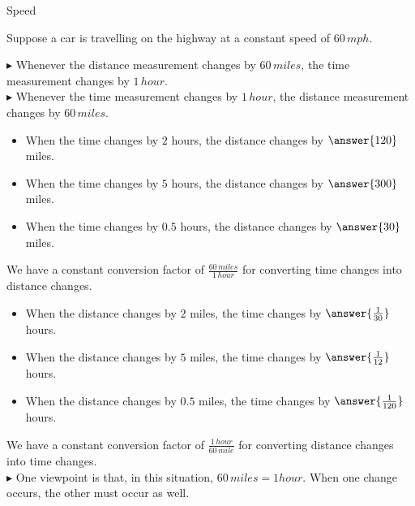\documentclass{ximera}
\begin{document}
\begin{example} Speed


Suppose a car is travelling on the highway at a constant speed of $60 \, mph$.


$\blacktriangleright$ Whenever the distance measurement changes by $60 \, miles$, the time measurement changes by $1 \, hour$. \\
$\blacktriangleright$ Whenever the time measurement changes by $1 \, hour$, the distance measurement changes by $60 \, miles$. \\




\begin{itemize}
\item When the time changes by $2$ hours, the distance changes by $\answer{120}$ miles. \\
\item When the time changes by $5$ hours, the distance changes by $\answer{300}$ miles. \\
\item When the time changes by $0.5$ hours, the distance changes by $\answer{30}$ miles. \\
\end{itemize}



We have a constant conversion factor of $\frac{60 \, miles}{1 \, hour}$ for converting time changes into distance changes. \\






\begin{itemize}
\item When the distance changes by $2$ miles, the time changes by $\answer{\frac{1}{30}}$ hours. \\
\item When the distance changes by $5$ miles, the time changes by $\answer{\frac{1}{12}}$ hours. \\
\item When the distance changes by $0.5$ miles, the time changes by $\answer{\frac{1}{120}}$ hours. \\
\end{itemize}



We have a constant conversion factor of $\frac{1 \, hour}{60 \, mile}$ for converting distance changes into time changes. \\




$\blacktriangleright$ One viewpoint is that, in this situation, $60 \, miles = 1 hour$.  When one change occurs, the other must occur as well.





\end{example} 
\end{document}
